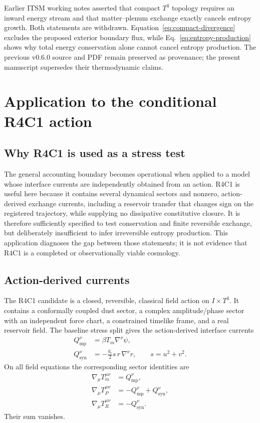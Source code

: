 \documentclass[aps,prd,reprint,superscriptaddress,nofootinbib,floatfix]{revtex4-2}
\newcommand{\Tthree}{T^{3}}
\newcommand{\Qmp}{Q_{\mathrm{mp}}}
\newcommand{\Qsyn}{Q_{\mathrm{syn}}}
\begin{document}
Earlier ITSM working notes asserted that compact \(\Tthree\) topology requires
an inward energy stream and that matter--plenum exchange exactly cancels
entropy growth.  Both statements are withdrawn.  Equation~\eqref{eq:compact-divergence}
excludes the proposed exterior boundary flux, while
Eq.~\eqref{eq:entropy-production} shows why total energy conservation alone
cannot cancel entropy production.  The previous v0.6.0 source and PDF remain
preserved as provenance; the present manuscript supersedes their
thermodynamic claims.

\section{Application to the conditional R4C1 action}
\label{sec:r4c1}

\subsection{Why R4C1 is used as a stress test}

The general accounting boundary becomes operational when applied to a model
whose interface currents are independently obtained from an action.  R4C1 is
useful here because it contains several dynamical sectors and nonzero,
action-derived exchange currents, including a reservoir transfer that changes
sign on the registered trajectory, while supplying no dissipative
constitutive closure.  It is therefore sufficiently specified to test
conservation and finite reversible exchange, but deliberately insufficient to
infer irreversible entropy production.  This application diagnoses the gap
between those statements; it is not evidence that R4C1 is a completed or
observationally viable cosmology.

\subsection{Action-derived currents}

The R4C1 candidate is a closed, reversible, classical field action on
\(I\times\Tthree\).  It contains a conformally coupled dust sector, a complex
amplitude/phase sector with an independent force chart, a constrained timelike
frame, and a real reservoir field.  The baseline stress split gives the
action-derived interface currents
\begin{align}
 \Qmp^\nu&=\beta T_m\nabla^\nu\psi, \\
 \Qsyn^\nu&=-\frac{g_r}{2}s\,r\,\nabla^\nu r,
 \qquad s=u^2+v^2 .
 \label{eq:r4c1-currents}
\end{align}
On all field equations the corresponding sector identities are
\begin{align}
 \nabla_\mu T_m^{\mu\nu}&=\Qmp^\nu,\\
 \nabla_\mu T_P^{\mu\nu}&=-\Qmp^\nu+\Qsyn^\nu,\\
 \nabla_\mu T_R^{\mu\nu}&=-\Qsyn^\nu.
 \label{eq:r4c1-balances}
\end{align}
Their sum vanishes.
\end{document}
